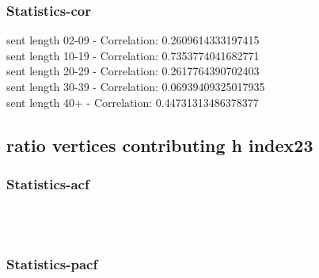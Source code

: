 \documentclass{article}%
\begin{document}
%
\newpage%
\subsubsection{Statistics{-}cor}%
\label{ssubsec:Statistics{-}cor}%
\noindent%
sent length 02-09 - Correlation: 0.2609614333197415\\%
sent length 10-19 - Correlation: 0.7353774041682771\\%
sent length 20-29 - Correlation: 0.2617764390702403\\%
sent length 30-39 - Correlation: 0.06939409325017935\\%
sent length 40+ - Correlation: 0.44731313486378377\\

%
\newpage

%
\subsection{ratio vertices contributing h index23}%
\label{subsec:ratioverticescontributinghindex23}%
\subsubsection{Statistics{-}acf}%
\label{ssubsec:Statistics{-}acf}%


\begin{figure}[ht]%
\centering%
\setlength{\abovecaptionskip}{-35pt}%
%
%
\\%
%
%
\\%
%
\end{figure}

%
\newpage%
\subsubsection{Statistics{-}pacf}%
\label{ssubsec:Statistics{-}pacf}%
\end{document}
